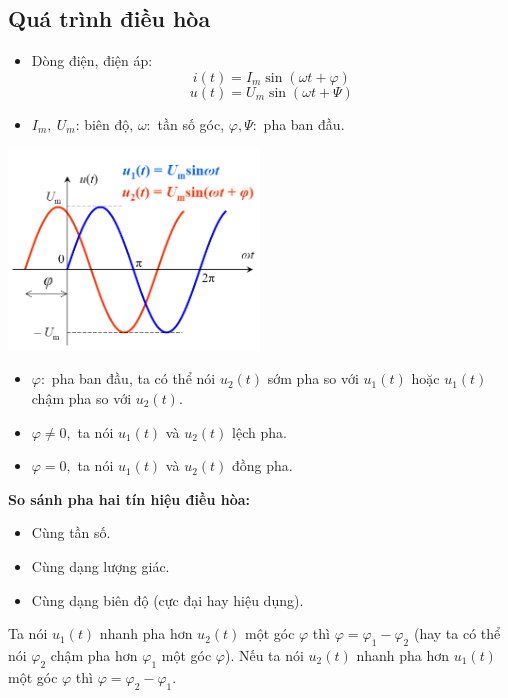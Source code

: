 \subsection{Quá trình điều hòa}
\begin{itemize}
    \item Dòng điện, điện áp:
        \[
            i(t) = I_m \sin (\omega t + \varphi)
        \]
        \[
            u(t) = U_m \sin (\omega t + \Psi)
        \]
    \item $I_m, \ U_m$: biên độ, $\omega:$ tần số góc, $\varphi, \Psi:$ pha ban đầu.
\end{itemize}
\begin{center}
    \includegraphics[width = 0.5\textwidth]{./image/29.png}
\end{center}
\begin{itemize}
    \item $\varphi:$ pha ban đầu, ta có thể nói $u_2(t)$ sớm pha so với $u_1(t)$ hoặc $u_1(t)$ chậm pha so với $u_2(t)$.
    \item $\varphi \neq 0,$ ta nói $u_1(t)$ và $u_2(t)$ lệch pha.
    \item $\varphi = 0,$ ta nói $u_1(t)$ và $u_2(t)$ đồng pha.
\end{itemize}
\textbf{So sánh pha hai tín hiệu điều hòa:}
\begin{itemize}
    \item Cùng tần số.
    \item Cùng dạng lượng giác.
    \item Cùng dạng biên độ (cực đại hay hiệu dụng).
\end{itemize}

Ta nói $u_1(t)$ nhanh pha hơn $u_2(t)$ một góc $\varphi$ thì $\varphi=\varphi_1 - \varphi_2$ (hay ta có thể nói $\varphi_2$ chậm pha hơn $\varphi_1$ một góc $\varphi$). Nếu ta nói $u_2(t)$ nhanh pha hơn $u_1(t)$ một góc $\varphi$ thì $\varphi=\varphi_2 - \varphi_1$.
